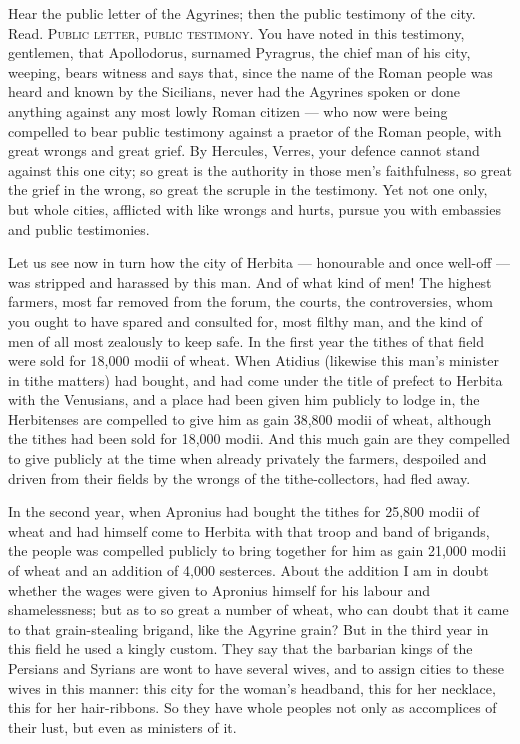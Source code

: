  Hear the public letter of the Agyrines; then the public testimony of the city. Read. \textsc{Public letter, public testimony}. You have noted in this testimony, gentlemen, that Apollodorus, surnamed Pyragrus, the chief man of his city, weeping, bears witness and says that, since the name of the Roman people was heard and known by the Sicilians, never had the Agyrines spoken or done anything against any most lowly Roman citizen --- who now were being compelled to bear public testimony against a praetor of the Roman people, with great wrongs and great grief. By Hercules, Verres, your defence cannot stand against this one city; so great is the authority in those men's faithfulness, so great the grief in the wrong, so great the scruple in the testimony. Yet not one only, but whole cities, afflicted with like wrongs and hurts, pursue you with embassies and public testimonies.

 Let us see now in turn how the city of Herbita --- honourable and once well-off --- was stripped and harassed by this man. And of what kind of men! The highest farmers, most far removed from the forum, the courts, the controversies, whom you ought to have spared and consulted for, most filthy man, and the kind of men of all most zealously to keep safe. In the first year the tithes of that field were sold for 18,000 modii of wheat. When Atidius (likewise this man's minister in tithe matters) had bought, and had come under the title of prefect to Herbita with the Venusians, and a place had been given him publicly to lodge in, the Herbitenses are compelled to give him as gain 38,800 modii of wheat, although the tithes had been sold for 18,000 modii. And this much gain are they compelled to give publicly at the time when already privately the farmers, despoiled and driven from their fields by the wrongs of the tithe-collectors, had fled away.

 In the second year, when Apronius had bought the tithes for 25,800 modii of wheat and had himself come to Herbita with that troop and band of brigands, the people was compelled publicly to bring together for him as gain 21,000 modii of wheat and an addition of 4,000 sesterces. About the addition I am in doubt whether the wages were given to Apronius himself for his labour and shamelessness; but as to so great a number of wheat, who can doubt that it came to that grain-stealing brigand, like the Agyrine grain? But in the third year in this field he used a kingly custom. They say that the barbarian kings of the Persians and Syrians are wont to have several wives, and to assign cities to these wives in this manner: this city for the woman's headband, this for her necklace, this for her hair-ribbons. So they have whole peoples not only as accomplices of their lust, but even as ministers of it.

